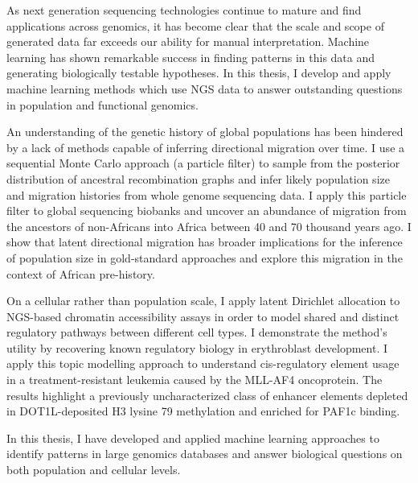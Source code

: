 As next generation sequencing technologies continue to mature and find applications across genomics, it has become clear that the scale and scope of generated data far exceeds our ability for manual interpretation. Machine learning has shown remarkable success in finding patterns in this data and generating biologically testable hypotheses. In this thesis, I develop and apply machine learning methods which use NGS data to answer outstanding questions in population and functional genomics.

An understanding of the genetic history of global populations has been hindered by a lack of methods capable of inferring directional migration over time. 
I use a sequential Monte Carlo approach (a particle filter) to sample from the posterior distribution of ancestral recombination graphs and infer likely population size and migration histories from whole genome sequencing data.
I apply this particle filter to global sequencing biobanks and uncover an abundance of migration from the ancestors of non-Africans into Africa between 40 and 70 thousand years ago. I show that latent directional migration has broader implications for the inference of population size in gold-standard approaches and explore this migration in the context of African pre-history.

On a cellular rather than population scale, I apply latent Dirichlet allocation to NGS-based chromatin accessibility assays in order to model shared and distinct regulatory pathways between different cell types. I demonstrate the method's utility by recovering known regulatory biology in erythroblast development. I apply this topic modelling approach to understand cis-regulatory element usage in a treatment-resistant leukemia caused by the MLL-AF4 oncoprotein. The results highlight a previously uncharacterized class of enhancer elements depleted in DOT1L-deposited H3 lysine 79 methylation and enriched for PAF1c binding. 

In this thesis, I have developed and applied machine learning approaches to identify patterns in large genomics databases and answer biological questions on both population and cellular levels. 